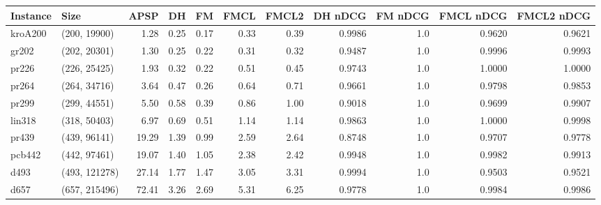 \begin{tabular}{llrrrrrrrrr}
\toprule
Instance &          Size &  APSP &   DH &   FM &  FMCL &  FMCL2 &  DH nDCG &  FM nDCG &  FMCL nDCG &  FMCL2 nDCG \\
\midrule
 kroA200 &  (200, 19900) &  1.28 & 0.25 & 0.17 &  0.33 &   0.39 &   0.9986 &      1.0 &     0.9620 &      0.9621 \\
   gr202 &  (202, 20301) &  1.30 & 0.25 & 0.22 &  0.31 &   0.32 &   0.9487 &      1.0 &     0.9996 &      0.9993 \\
   pr226 &  (226, 25425) &  1.93 & 0.32 & 0.22 &  0.51 &   0.45 &   0.9743 &      1.0 &     1.0000 &      1.0000 \\
   pr264 &  (264, 34716) &  3.64 & 0.47 & 0.26 &  0.64 &   0.71 &   0.9661 &      1.0 &     0.9798 &      0.9853 \\
   pr299 &  (299, 44551) &  5.50 & 0.58 & 0.39 &  0.86 &   1.00 &   0.9018 &      1.0 &     0.9699 &      0.9907 \\
  lin318 &  (318, 50403) &  6.97 & 0.69 & 0.51 &  1.14 &   1.14 &   0.9863 &      1.0 &     1.0000 &      0.9998 \\
   pr439 &  (439, 96141) & 19.29 & 1.39 & 0.99 &  2.59 &   2.64 &   0.8748 &      1.0 &     0.9707 &      0.9778 \\
  pcb442 &  (442, 97461) & 19.07 & 1.40 & 1.05 &  2.38 &   2.42 &   0.9948 &      1.0 &     0.9982 &      0.9913 \\
    d493 & (493, 121278) & 27.14 & 1.77 & 1.47 &  3.05 &   3.31 &   0.9994 &      1.0 &     0.9503 &      0.9521 \\
    d657 & (657, 215496) & 72.41 & 3.26 & 2.69 &  5.31 &   6.25 &   0.9778 &      1.0 &     0.9984 &      0.9986 \\
\bottomrule
\end{tabular}
